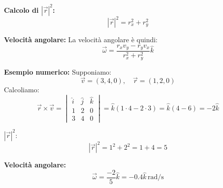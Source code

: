 \documentclass{beamer}
\begin{document}
    
    \begin{frame}
        
    \textbf{Calcolo di \(|\vec{r}|^2\):}
    \[
    |\vec{r}|^2 = r_x^2 + r_y^2
    \]

    \textbf{Velocità angolare:}
    La velocità angolare è quindi:
    \[
    \vec{\omega} = \frac{r_x v_y - r_y v_x}{r_x^2 + r_y^2} \hat{k}
    \]

    \textbf{Esempio numerico:}
    Supponiamo:
    \[
    \vec{v} = (3, 4, 0), \quad \vec{r} = (1, 2, 0)
    \]
    Calcoliamo:
    \[
    \vec{r} \times \vec{v} = \begin{vmatrix}
    \hat{i} & \hat{j} & \hat{k} \\
    1 & 2 & 0 \\
    3 & 4 & 0
    \end{vmatrix}
    = \hat{k}(1 \cdot 4 - 2 \cdot 3) = \hat{k}(4 - 6) = -2\hat{k}
    \]

    \(|\vec{r}|^2\):
    \[
    |\vec{r}|^2 = 1^2 + 2^2 = 1 + 4 = 5
    \]

    \textbf{Velocità angolare:}
    \[
    \vec{\omega} = \frac{-2}{5} \hat{k} = -0.4 \hat{k} \, \mathrm{rad/s}
    \]


\end{frame}
\end{document}
